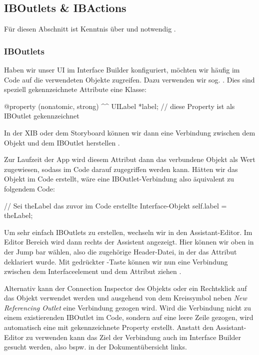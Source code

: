 \documentclass[parskip=half, final]{scrreprt}
\begin{document}
\subsection{IBOutlets \& IBActions}\label{sec:iboutletsibactions}

 Für diesen Abschnitt ist Kenntnis über   und   notwendig .

\subsubsection{IBOutlets}

Haben wir unser UI im Interface Builder konfiguriert, möchten wir häufig im Code auf die verwendeten Objekte zugreifen. Dazu verwenden wir sog. . Dies sind speziell gekennzeichnete Attribute eine Klasse:
\begin{objclst}
@property (nonatomic, strong) ^^ UILabel *label; // diese Property ist als IBOutlet gekennzeichnet
\end{objclst}

In der XIB oder dem Storyboard können wir dann eine Verbindung zwischen dem Objekt und dem IBOutlet herstellen .


Zur Laufzeit der App wird diesem Attribut dann das verbundene Objekt als Wert zugewiesen, sodass im Code darauf zugegriffen werden kann. Hätten wir das Objekt im Code erstellt, wäre eine IBOutlet-Verbindung also äquivalent zu folgendem Code:
\begin{objclst}
// Sei theLabel das zuvor im Code erstellte Interface-Objekt
self.label = theLabel;
\end{objclst}

Um sehr einfach IBOutlets zu erstellen, wechseln wir in den Assistant-Editor. Im Editor Bereich wird dann rechts der Assistent angezeigt. Hier können wir oben in der Jump bar  wählen, also die zugehörige Header-Datei, in der das Attribut deklariert wurde. Mit gedrückter \keys{\ctrlkey}-Taste können wir nun eine Verbindung zwischen dem Interfaceelement und dem Attribut ziehen .

Alternativ kann der Connection Inspector des Objekts  oder ein Rechtsklick auf das Objekt verwendet werden und ausgehend von dem Kreissymbol neben \emph{New Referencing Outlet} eine Verbindung gezogen wird. Wird die Verbindung nicht zu einem existierenden IBOutlet im Code, sondern auf eine leere Zeile gezogen, wird automatisch eine mit  gekennzeichnete Property erstellt. Anstatt den Assistant-Editor zu verwenden kann das Ziel der Verbindung auch im Interface Builder gesucht werden, also bspw. in der Dokumentübersicht links.
\end{document}
